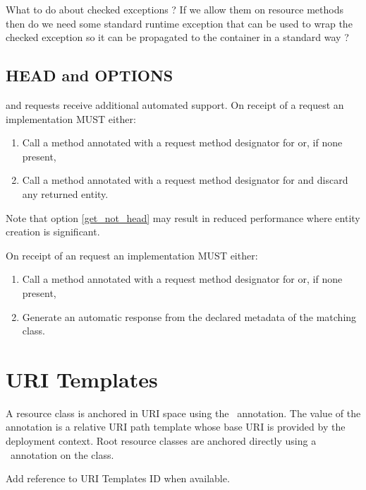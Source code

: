 \begin{ednote}What to do about checked exceptions ? If we allow them on resource methods then do we need some standard runtime exception that can be used to wrap the checked exception so it can be propagated to the container in a standard way ?\end{ednote}

\subsection{HEAD and OPTIONS}
\label{head_and_options}

 and  requests receive additional automated support. On receipt of a request an implementation MUST either:

\begin{enumerate}
\item Call a method annotated with a request method designator for  or, if none present,
\item\label{get_not_head} Call a method annotated with a request method designator for  and discard any returned entity.
\end{enumerate}

Note that option \ref{get_not_head} may result in reduced performance where entity creation is significant.

On receipt of an  request an implementation MUST either:

\begin{enumerate}
\item Call a method annotated with a request method designator for  or, if none present,
\item Generate an automatic response from the declared metadata of the matching class.
\end{enumerate}

\section{URI Templates}

A resource class is anchored in URI space using the \Path\ annotation. The value of the annotation is a relative URI path template whose base URI is provided by the deployment context. Root resource classes are anchored directly using a \Path\ annotation on the class.

\begin{ednote}Add reference to URI Templates ID when available.\end{ednote}

